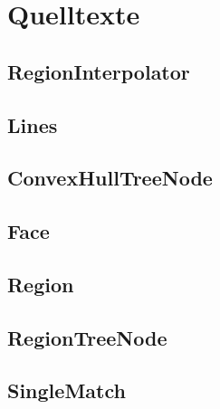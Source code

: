 
\chapter{Quelltexte}
\minitoc
\newpage
\begin{landscape}

\begin{tiny}
\section{RegionInterpolator}


\section{Lines}


\section{ConvexHullTreeNode}


\section{Face}


\section{Region}


\section{RegionTreeNode}


\section{SingleMatch}



\end{tiny}
\end{landscape}
